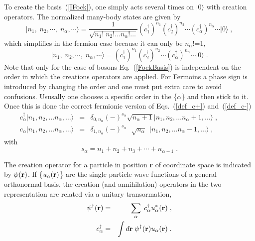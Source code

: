 To create the basis~(\ref{IFock}), one simply acts several times on $\vert0\rangle$ with creation
operators. The normalized many-body states are given by
\begin{equation}
\vert  n_1, \; n_2, \cdots, \;  n_\alpha, \cdots  \rangle
 = \frac{1}{\sqrt{n_1! \; n_2! \ldots  n_\alpha! \ldots}}
 (c^\dag_1)^{n_1} (c^\dag_2)^{n_2}  \cdots (c^\dag_\alpha)^{n_\alpha}  \cdots \vert 0 \rangle \; ,
\label{FockBasis}
\end{equation}
which simplifies in the fermion case because it can only be $n_\alpha !$=1,
\begin{equation}
\vert  n_1, \; n_2, \cdots, \;  n_\alpha, \cdots  \rangle = 
 (c^\dag_1)^{n_1} (c^\dag_2)^{n_2}  \cdots (c^\dag_\alpha)^{n_\alpha}  \cdots \vert 0 \rangle \; .
 \label{FockBasis_f}
\end{equation}
Note that only for the case of bosons Eq.~(\ref{FockBasis}) is independent on the order in which the creations operators are applied. For Fermoins a phase sign is introduced by changing the order and one must put extra care to avoid confusions. 
Ususally one chooses a specific order in the \{$\alpha$\} and then stick to it. 
Once this is done the correct fermionic version of Eqs.~(\ref{def_c+}) and~(\ref{def_c-})
\begin{eqnarray}
 c^\dag_\alpha \vert  n_1, n_2, \ldots   n_\alpha, \ldots  \rangle&=&\delta_{0,n_\alpha} (-)^{s_\alpha}
 \sqrt{n_\alpha+1}  \vert  n_1,  n_2, \ldots   n_\alpha+1, \ldots  \rangle \; , \quad \qquad
 \label{phase_c+}
\\
 c_\alpha \vert  n_1,  n_2, \ldots  n_\alpha, \ldots  \rangle &=&
 \delta_{1,n_\alpha} (-)^{s_\alpha}
  ~ ~ ~  \sqrt{n_\alpha} ~ ~ \vert  n_1,  n_2, \ldots   n_\alpha-1, \ldots  \rangle \; ,
 \label{phase_c-}
\end{eqnarray}
with
\begin{equation}
 s_\alpha = n_1 + n_2 + n_3 + \cdots + n_{\alpha-1} \; .
 \label{FockFermionPhase}
\end{equation}

The creation operator for a particle in position {\bf r} of coordinate space is indicated by $\psi({\bf r})$. If \{$u_\alpha({\bf r})$\} are the single particle wave functions of a general orthonormal basis, the 
 creation (and annihilation) operators in the two representation are related via a unitary transormation,
\begin{eqnarray}
 \psi^\dag({\bf r}) &=& \sum_\alpha \;  c^\dag_\alpha  u^*_\alpha({\bf r})   \; ,
\label{psi_vs_a}
\\
 c^\dag_\alpha  &=& \int d{\bf r}   \;  \psi^\dag({\bf r}) u_\alpha({\bf r}) \; .
\label{a_vs_psi}
\end{eqnarray}

